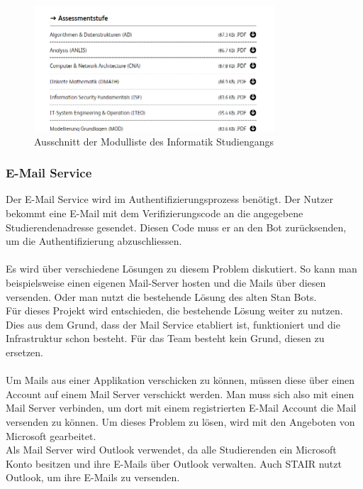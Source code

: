 \documentclass[a4paper, table]{article}
\begin{document}
\begin{figure}[hb]
    \centering
    \includegraphics[width=0.8\textwidth]{img/ausschnittModullisteHsluInformatik.PNG}
    \caption{Ausschnitt der Modulliste des Informatik Studiengangs}
    \label{fig:modulliste-informatik}
\end{figure}
\clearpage

\subsubsection{E-Mail Service}
Der E-Mail Service wird im Authentifizierungsprozess benötigt. 
Der Nutzer bekommt eine E-Mail mit dem Verifizierungscode an die angegebene Studierendenadresse gesendet. 
Diesen Code muss er an den Bot zurücksenden, um die Authentifizierung abzuschliessen.\\\\
Es wird über verschiedene Lösungen zu diesem Problem diskutiert.
So kann man beispielsweise einen eigenen Mail-Server hosten und die Mails über diesen versenden.  
Oder man nutzt die bestehende Lösung des alten Stan Bots.\\
Für dieses Projekt wird entschieden, die bestehende Lösung weiter zu nutzen. 
Dies aus dem Grund, dass der Mail Service etabliert ist, funktioniert und die Infrastruktur schon besteht. 
Für das Team besteht kein Grund, diesen zu ersetzen.\\\\
Um Mails aus einer Applikation verschicken zu können, müssen diese über einen Account auf einem Mail Server verschickt werden. 
Man muss sich also mit einen Mail Server verbinden, um dort mit einem registrierten E-Mail Account die Mail versenden zu können. 
Um dieses Problem zu lösen, wird mit den Angeboten von Microsoft gearbeitet.\\
Als Mail Server wird Outlook verwendet, da alle Studierenden ein Microsoft Konto besitzen und ihre E-Mails über Outlook verwalten. 
Auch STAIR nutzt Outlook, um ihre E-Mails zu versenden.
\end{document}
